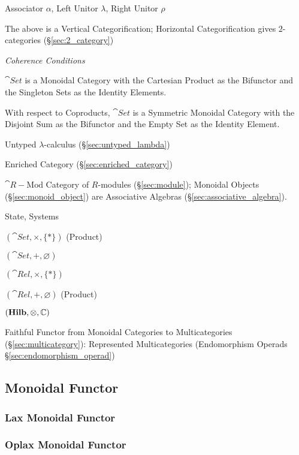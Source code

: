 Associator $\alpha$, Left Unitor $\lambda$, Right Unitor $\rho$

The above is a Vertical Categorification; Horizontal Categorification
gives $2$-categories (\S\ref{sec:2_category})

\emph{Coherence Conditions}

$\cat{Set}$ is a Monoidal Category with the Cartesian Product as
the Bifunctor and the Singleton Sets as the Identity Elements.

With respect to Coproducts, $\cat{Set}$ is a Symmetric Monoidal
Category with the Disjoint Sum as the Bifunctor and the Empty
Set as the Identity Element.

Untyped $\lambda$-calculus (\S\ref{sec:untyped_lambda})

Enriched Category (\S\ref{sec:enriched_category})

$\cat{R-\text{Mod}}$ Category of $R$-modules (\S\ref{sec:module});
Monoidal Objects (\S\ref{sec:monoid_object}) are Associative Algebras
(\S\ref{sec:associative_algebra}).

State, Systems %

$(\cat{Set}, \times, \{*\})$ (Product)

$(\cat{Set}, +, \varnothing)$

$(\cat{Rel}, \times, \{*\})$

$(\cat{Rel}, +, \varnothing)$ (Product)

$(\mathbf{Hilb}, \otimes, \mathbb{C})$

Faithful Functor from Monoidal Categories to Multicategories
(\S\ref{sec:multicategory}): Represented Multicategories (Endomorphism
Operads \S\ref{sec:endomorphism_operad})



\subsection{Monoidal Functor}\label{sec:monoidal_functor}

\subsubsection{Lax Monoidal Functor}\label{sec:lax_monoidal_functor}

\subsubsection{Oplax Monoidal Functor}\label{sec:oplax_monoidal_functor}

